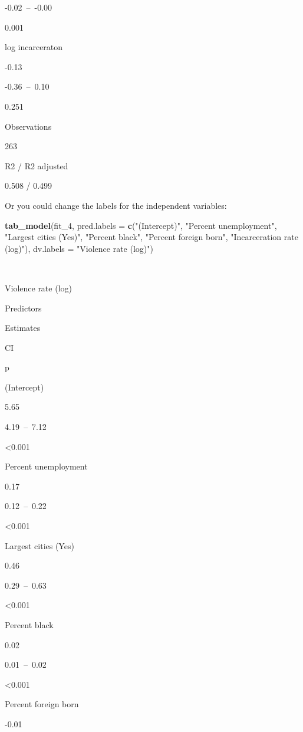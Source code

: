 \documentclass[
]{book}
\newenvironment{Shaded}{\begin{snugshade}}{\end{snugshade}}
\newcommand{\AttributeTok}[1]{\textcolor[rgb]{0.13,0.29,0.53}{#1}}
\newcommand{\FunctionTok}[1]{\textcolor[rgb]{0.13,0.29,0.53}{\textbf{#1}}}
\newcommand{\NormalTok}[1]{#1}
\newcommand{\StringTok}[1]{\textcolor[rgb]{0.31,0.60,0.02}{#1}}
\begin{document}
-0.02~--~-0.00

0.001

log incarceraton

-0.13

-0.36~--~0.10

0.251

Observations

263

R2 / R2 adjusted

0.508 / 0.499

Or you could change the labels for the independent variables:

\begin{Shaded}
\begin{Highlighting}[]
\FunctionTok{tab\_model}\NormalTok{(fit\_4, }\AttributeTok{pred.labels =} \FunctionTok{c}\NormalTok{(}\StringTok{"(Intercept)"}\NormalTok{, }\StringTok{"Percent unemployment"}\NormalTok{, }\StringTok{"Largest cities (Yes)"}\NormalTok{, }\StringTok{"Percent black"}\NormalTok{, }\StringTok{"Percent foreign born"}\NormalTok{, }\StringTok{"Incarceration rate (log)"}\NormalTok{), }\AttributeTok{dv.labels =} \StringTok{"Violence rate (log)"}\NormalTok{)}
\end{Highlighting}
\end{Shaded}

~

Violence rate (log)

Predictors

Estimates

CI

p

(Intercept)

5.65

4.19~--~7.12

\textless0.001

Percent unemployment

0.17

0.12~--~0.22

\textless0.001

Largest cities (Yes)

0.46

0.29~--~0.63

\textless0.001

Percent black

0.02

0.01~--~0.02

\textless0.001

Percent foreign born

-0.01
\end{document}
